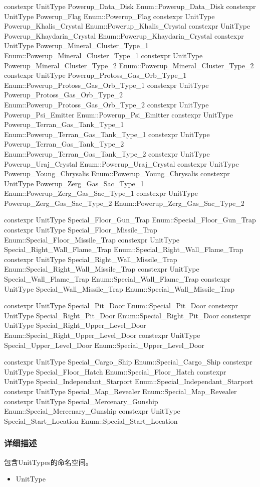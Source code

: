 \begin{codebox}[变量(增益)]
constexpr UnitType Powerup_Data_Disk {Enum::Powerup_Data_Disk}
constexpr UnitType Powerup_Flag {Enum::Powerup_Flag}
constexpr UnitType Powerup_Khalis_Crystal {Enum::Powerup_Khalis_Crystal}
constexpr UnitType Powerup_Khaydarin_Crystal {Enum::Powerup_Khaydarin_Crystal}
constexpr UnitType Powerup_Mineral_Cluster_Type_1 {Enum::Powerup_Mineral_Cluster_Type_1}
constexpr UnitType Powerup_Mineral_Cluster_Type_2 {Enum::Powerup_Mineral_Cluster_Type_2}
constexpr UnitType Powerup_Protoss_Gas_Orb_Type_1 {Enum::Powerup_Protoss_Gas_Orb_Type_1}
constexpr UnitType Powerup_Protoss_Gas_Orb_Type_2 {Enum::Powerup_Protoss_Gas_Orb_Type_2}
constexpr UnitType Powerup_Psi_Emitter {Enum::Powerup_Psi_Emitter}
constexpr UnitType Powerup_Terran_Gas_Tank_Type_1 {Enum::Powerup_Terran_Gas_Tank_Type_1}
constexpr UnitType Powerup_Terran_Gas_Tank_Type_2 {Enum::Powerup_Terran_Gas_Tank_Type_2}
constexpr UnitType Powerup_Uraj_Crystal {Enum::Powerup_Uraj_Crystal}
constexpr UnitType Powerup_Young_Chrysalis {Enum::Powerup_Young_Chrysalis}
constexpr UnitType Powerup_Zerg_Gas_Sac_Type_1 {Enum::Powerup_Zerg_Gas_Sac_Type_1}
constexpr UnitType Powerup_Zerg_Gas_Sac_Type_2 {Enum::Powerup_Zerg_Gas_Sac_Type_2}
\end{codebox}
\begin{codebox}[变量(陷阱)]
constexpr UnitType Special_Floor_Gun_Trap {Enum::Special_Floor_Gun_Trap}
constexpr UnitType Special_Floor_Missile_Trap {Enum::Special_Floor_Missile_Trap}
constexpr UnitType Special_Right_Wall_Flame_Trap {Enum::Special_Right_Wall_Flame_Trap}
constexpr UnitType Special_Right_Wall_Missile_Trap {Enum::Special_Right_Wall_Missile_Trap}
constexpr UnitType Special_Wall_Flame_Trap {Enum::Special_Wall_Flame_Trap}
constexpr UnitType Special_Wall_Missile_Trap {Enum::Special_Wall_Missile_Trap}
\end{codebox}
\begin{codebox}[变量(门)]
constexpr UnitType Special_Pit_Door {Enum::Special_Pit_Door}
constexpr UnitType Special_Right_Pit_Door {Enum::Special_Right_Pit_Door}
constexpr UnitType Special_Right_Upper_Level_Door {Enum::Special_Right_Upper_Level_Door}
constexpr UnitType Special_Upper_Level_Door {Enum::Special_Upper_Level_Door}
\end{codebox}
\begin{codebox}[变量(特殊)]
constexpr UnitType Special_Cargo_Ship {Enum::Special_Cargo_Ship}
constexpr UnitType Special_Floor_Hatch {Enum::Special_Floor_Hatch}
constexpr UnitType Special_Independant_Starport {Enum::Special_Independant_Starport}
constexpr UnitType Special_Map_Revealer {Enum::Special_Map_Revealer}
constexpr UnitType Special_Mercenary_Gunship {Enum::Special_Mercenary_Gunship}
constexpr UnitType Special_Start_Location {Enum::Special_Start_Location}
\end{codebox}

\subsubsection{详细描述}
包含UnitTypes的命名空间。
\begin{refer}
\begin{itemize}
\item UnitType
\end{itemize}
\end{refer}